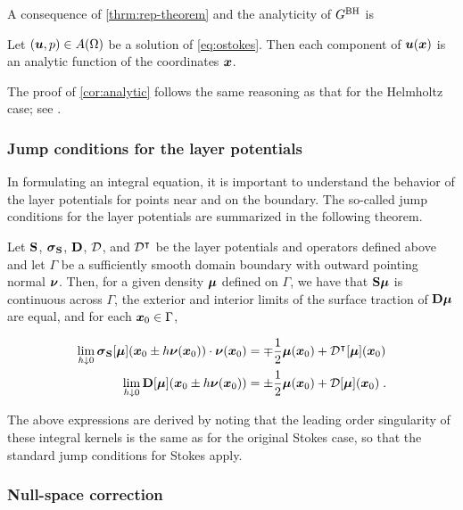 A consequence of \cref{thrm:rep-theorem} and the analyticity
of $G^{\textrm{BH}}$ is 
\begin{cor}
\label{cor:analytic}  
  Let $({\boldsymbol u},p) \in A(\Omega)$ be a solution of \cref{eq:ostokes}.
  Then each component of ${\boldsymbol u}({\boldsymbol x})$ is an analytic function
  of the coordinates ${\boldsymbol x}$.
\end{cor}

The proof of \cref{cor:analytic} follows the same reasoning as
that for the Helmholtz case; see \cite[Theorem 3.5]{colton1983integral}.

\subsubsection{Jump conditions for the layer potentials}

In formulating an integral equation, it is important
to understand the behavior of the layer potentials
for points near and on the boundary. The so-called jump
conditions for the layer potentials are summarized in the
following theorem.


\begin{lem} \label{lem:jump-conds}
  Let ${\bf S}$, ${\boldsymbol \sigma}_{\bf S}$, ${\bf D}$, ${\mathcal D}$, and ${\mathcal D}^{\intercal}$ be
  the layer potentials and operators defined above and
  let $\Gamma$ be a sufficiently smooth domain boundary
  with outward pointing normal ${\boldsymbol \nu}$. Then, for
  a given density ${\boldsymbol \mu}$ defined on $\Gamma$,
  we have that ${\bf S} {\boldsymbol \mu}$
  is continuous across $\Gamma$, the exterior and interior
  limits of the surface traction of ${\bf D} {\boldsymbol \mu}$ are equal,
  and for each ${\boldsymbol x}_0 \in \Gamma$,

  \begin{align}
    \lim_{h \downarrow 0} {\boldsymbol \sigma}_{\bf S}[{\boldsymbol \mu}]({\boldsymbol x}_0 \pm h{\boldsymbol \nu}({\boldsymbol x}_0)) \cdot {\boldsymbol \nu}({\boldsymbol x}_0)
    &= \mp \frac{1}{2} {\boldsymbol \mu}({\boldsymbol x}_0) + {\mathcal D}^{\intercal}[{\boldsymbol \mu}]({\boldsymbol x}_0) \\
    \lim_{h \downarrow 0} {\bf D}[{\boldsymbol \mu}]({\boldsymbol x}_0 \pm h{\boldsymbol \nu}({\boldsymbol x}_0)) 
    &= \pm \frac{1}{2} {\boldsymbol \mu}({\boldsymbol x}_0) + {\mathcal D}[{\boldsymbol \mu}]({\boldsymbol x}_0)    \; .
  \end{align}
\end{lem}

The above expressions are derived by noting that the
leading order singularity of these integral kernels
is the same as for the original Stokes case, so that
the standard jump conditions for Stokes
\cite{KimSangtae1991M:pa,Pozrikidis1992}
apply. 


\subsubsection{Null-space correction \label{subsubsec:nullspacecorr}}

